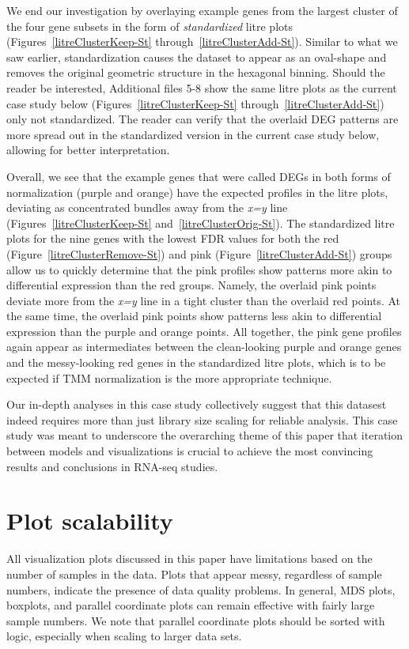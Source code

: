 \documentclass{bmcart}
\begin{document}
\begin{linenumbers}
\begin{doublespacing}
We end our investigation by overlaying example genes from the largest cluster of the four gene subsets in the form of \textit{standardized} litre plots (Figures~\ref{litreClusterKeep-St} through~\ref{litreClusterAdd-St}). Similar to what we saw earlier, standardization causes the dataset to appear as an oval-shape and removes the original geometric structure in the hexagonal binning. Should the reader be interested, Additional files 5-8 show the same litre plots as the current case study below (Figures~\ref{litreClusterKeep-St} through~\ref{litreClusterAdd-St}) only not standardized. The reader can verify that the overlaid DEG patterns are more spread out in the standardized version in the current case study below, allowing for better interpretation.

Overall, we see that the example genes that were called DEGs in both forms of normalization (purple and orange) have the expected profiles in the litre plots, deviating as concentrated bundles away from the \textit{x=y} line (Figures~\ref{litreClusterKeep-St} and~\ref{litreClusterOrig-St}). The standardized litre plots for the nine genes with the lowest FDR values for both the red (Figure~\ref{litreClusterRemove-St}) and pink (Figure~\ref{litreClusterAdd-St}) groups allow us to quickly determine that the pink profiles show patterns more akin to differential expression than the red groups. Namely, the overlaid pink points deviate more from the \textit{x=y} line in a tight cluster than the overlaid red points. At the same time, the overlaid pink points show patterns less akin to differential expression than the purple and orange points. All together, the pink gene profiles again appear as intermediates between the clean-looking purple and orange genes and the messy-looking red genes in the standardized litre plots, which is to be expected if TMM normalization is the more appropriate technique.

Our in-depth analyses in this case study collectively suggest that this datasest indeed requires more than just library size scaling for reliable analysis. This case study was meant to underscore the overarching theme of this paper that iteration between models and visualizations is crucial to achieve the most convincing results and conclusions in RNA-seq studies.

\section*{Plot scalability}

All visualization plots discussed in this paper have limitations based on the number of samples in the data. Plots that appear messy, regardless of sample numbers, indicate the presence of data quality problems. In general, MDS plots, boxplots, and parallel coordinate plots can remain effective with fairly large sample numbers. We note that parallel coordinate plots should be sorted with logic, especially when scaling to larger data sets.


\end{doublespacing}
\end{linenumbers}
\end{document}
